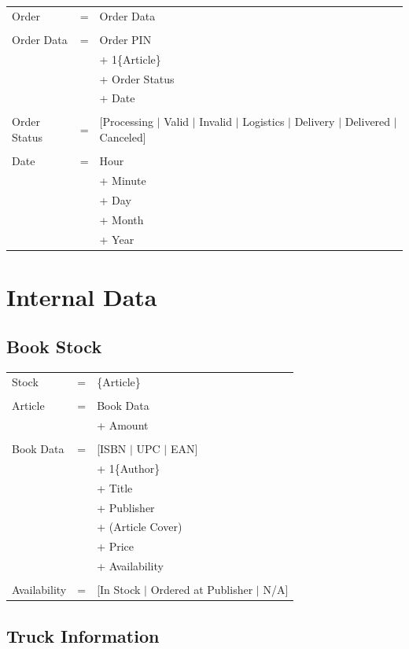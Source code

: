 \documentclass[11pt,a4paper,oneside,svgnames]{report}
\begin{document}
\begin{longtable}{p{3.5cm}p{0.5cm}p{8.5cm}}
Order & = & Order Data\\
\\
Order Data & = & Order PIN\\
&  & + 1\{Article\}\\
&  & + Order Status\\
&  & + Date \\
\\
Order Status & = & [Processing $|$ Valid $|$ Invalid $|$ Logistics $|$ Delivery $|$ Delivered $|$ Canceled] \\
\\
Date & = & Hour\\
&  & + Minute\\
&  & + Day\\
&  & + Month\\
&  & + Year\\
\end{longtable}

\section{Internal Data}

\subsection{Book Stock}
\begin{longtable}{p{3.5cm}p{0.5cm}p{8.5cm}}
Stock & = & \{Article\} \\
\\
Article & = & Book Data\\
&  & + Amount\\
\\
Book Data & = & [ISBN $|$ UPC $|$ EAN]\\
&  & + 1\{Author\}\\
&  & + Title\\
&  & + Publisher\\
&  & + (Article Cover)\\
&  & + Price\\
&  & + Availability\\
\\
Availability & = & [In Stock $|$ Ordered at Publisher $|$ N/A]\\
\end{longtable}

\subsection{Truck Information}
\end{document}
